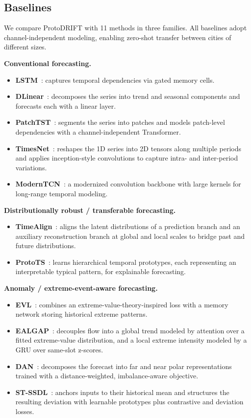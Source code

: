 \subsection{Baselines}

We compare ProtoDRIFT with 11 methods in three families. All baselines adopt channel-independent modeling, enabling zero-shot transfer between cities of different sizes.

\noindent\textbf{Conventional forecasting.}
\begin{itemize}
    \item \textbf{LSTM}~\cite{lstm}: captures temporal dependencies via gated memory cells.
    \item \textbf{DLinear}~\cite{dlinear}: decomposes the series into trend and seasonal components and forecasts each with a linear layer.
    \item \textbf{PatchTST}~\cite{PatchTST}: segments the series into patches and models patch-level dependencies with a channel-independent Transformer.
    \item \textbf{TimesNet}~\cite{timesnet}: reshapes the 1D series into 2D tensors along multiple periods and applies inception-style convolutions to capture intra- and inter-period variations.
    \item \textbf{ModernTCN}~\cite{moderntcn}: a modernized convolution backbone with large kernels for long-range temporal modeling.
\end{itemize}

\noindent\textbf{Distributionally robust / transferable forecasting.}
\begin{itemize}
    \item \textbf{TimeAlign}~\cite{timealign}: aligns the latent distributions of a prediction branch and an auxiliary reconstruction branch at global and local scales to bridge past and future distributions.
    \item \textbf{ProtoTS}~\cite{protots}: learns hierarchical temporal prototypes, each representing an interpretable typical pattern, for explainable forecasting.
\end{itemize}

\noindent\textbf{Anomaly / extreme-event-aware forecasting.}
\begin{itemize}
    \item \textbf{EVL}~\cite{evl}: combines an extreme-value-theory-inspired loss with a memory network storing historical extreme patterns.
    \item \textbf{EALGAP}~\cite{ealgap}: decouples flow into a global trend modeled by attention over a fitted extreme-value distribution, and a local extreme intensity modeled by a GRU over same-slot z-scores.
    \item \textbf{DAN}~\cite{dan}: decomposes the forecast into far and near polar representations trained with a distance-weighted, imbalance-aware objective.
    \item \textbf{ST-SSDL}~\cite{stssdl}: anchors inputs to their historical mean and structures the resulting deviation with learnable prototypes plus contrastive and deviation losses.
\end{itemize}

